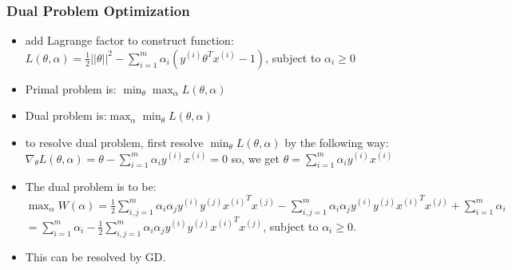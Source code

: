 \begin{frame}
\frametitle{Dual Problem Optimization}
	\small
	\begin{itemize}
		\item add Lagrange factor to construct function:
			\\ $L(\theta,\alpha)=\frac{1}{2}||\theta||^2-\sum_{i=1}^{m}\alpha_i(y^{(i)}\theta^Tx^{(i)}-1)$, subject to $\alpha_i \geq 0$
		\item Primal problem is: $\min_{\theta}\max_{\alpha}L(\theta,\alpha)$ 
		\item Dual problem is:$\max_{\alpha}\min_{\theta}L(\theta,\alpha)$
		\item to resolve dual problem, first resolve $\min_{\theta}L(\theta,\alpha)$ by the following way:\\
		$\nabla_{\theta}L(\theta,\alpha)=\theta-\sum_{i=1}^{m}\alpha_iy^{(i)}x^{(i)}=0$
		so, we get $\theta=\sum_{i=1}^{m}\alpha_iy^{(i)}x^{(i)}$
		\item The dual problem is to be:\\
		 	$\max_{\alpha}W(\alpha)=
				\frac{1}{2}\sum_{i,j=1}^{m}\alpha_i\alpha_jy^{(i)}y^{(j)}{x^{(i)}}^Tx^{(j)}
					-\sum_{i,j=1}^{m}\alpha_i\alpha_jy^{(i)}y^{(j)}{x^{(i)}}^Tx^{(j)}
					+\sum_{i=1}^{m}\alpha_i$
			$=\sum_{i=1}^{m}\alpha_i-\frac{1}{2}\sum_{i,j=1}^{m}\alpha_i\alpha_jy^{(i)}y^{(j)}{x^{(i)}}^Tx^{(j)}$, subject to $\alpha_i \geq 0$.
		\item This can be resolved by GD.
	\end{itemize}
\end{frame}
